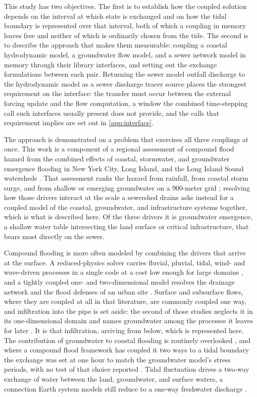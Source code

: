 \documentclass[preprint,authoryear,11pt]{elsarticle}
\begin{document}
This study has two objectives. The first is to establish how the coupled solution depends on the interval at which state is exchanged and on how the tidal boundary is represented over that interval, both of which a coupling in memory leaves free and neither of which is ordinarily chosen from the tide. The second is to describe the approach that makes them measurable: coupling a coastal hydrodynamic model, a groundwater flow model, and a sewer network model in memory through their library interfaces, and setting out the exchange formulations between each pair. Returning the sewer model outfall discharge to the hydrodynamic model as a sewer discharge tracer source places the strongest requirement on the interface: the transfer must occur between the external forcing update and the flow computation, a window the combined time-stepping call such interfaces usually present does not provide, and the calls that requirement implies are set out in \ref{app:interface}.

The approach is demonstrated on a problem that exercises all three couplings at once. This work is a component of a regional assessment of compound flood hazard from the combined effects of coastal, stormwater, and groundwater emergence flooding in New York City, Long Island, and the Long Island Sound watersheds \citep{usgs2021compound}. That assessment ranks the hazard from rainfall, from coastal storm surge, and from shallow or emerging groundwater on a 900-meter grid \citep{usgs2026lismap}; resolving how those drivers interact at the scale a sewershed drains asks instead for a coupled model of the coastal, groundwater, and infrastructure systems together, which is what is described here. Of the three drivers it is groundwater emergence, a shallow water table intersecting the land surface or critical infrastructure, that bears most directly on the sewer.

Compound flooding is more often modeled by combining the drivers that arrive at the surface. A reduced-physics solver carries fluvial, pluvial, tidal, wind- and wave-driven processes in a single code at a cost low enough for large domains \citep{leijnse2021compound}, and a tightly coupled one- and two-dimensional model resolves the drainage network and the flood defenses of an urban site \citep{tang2025compound}. Surface and subsurface flows, where they are coupled at all in that literature, are commonly coupled one way, and infiltration into the pipe is set aside: the second of those studies neglects it in its one-dimensional domain and names groundwater among the processes it leaves for later \citep{tang2025compound}. It is that infiltration, arriving from below, which is represented here. The contribution of groundwater to coastal flooding is routinely overlooked \citep{seidenfaden2025compound}, and where a compound flood framework has coupled it two ways to a tidal boundary the exchange was set at one hour to match the groundwater model's stress periods, with no test of that choice reported \citep{pena2022compound}. Tidal fluctuation drives a two-way exchange of water between the land, groundwater, and surface waters, a connection Earth system models still reduce to a one-way freshwater discharge \citep{ward2020coastal}.
\end{document}
